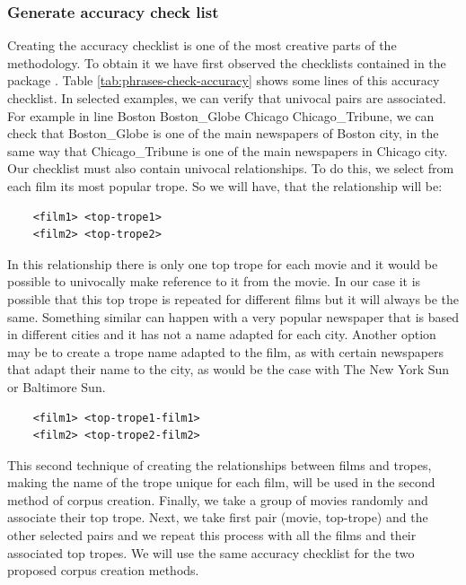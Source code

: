 \documentclass[letterpaper]{article}
\begin{document}
	
	\subsubsection{Generate accuracy check list}
	Creating the accuracy checklist is one of the most creative parts of the methodology. To obtain it we have first observed the checklists contained in the package \cite{git-hub-word2vec}. Table \ref{tab:phrases-check-accuracy} shows some lines of this accuracy checklist. 
	In selected examples, we can verify that univocal pairs are associated. For example in line	Boston Boston\_Globe Chicago Chicago\_Tribune, we can check that 
	Boston\_Globe is one of the main newspapers of Boston city, in the same way that Chicago\_Tribune is one of the main newspapers in Chicago city. Our checklist must also contain univocal relationships. To do this, we select from each film its most popular trope. So we will have, that the relationship will be:
	
	\begin{verbatim}
	<film1> <top-trope1> 
	<film2> <top-trope2>
	\end{verbatim}
	
	In this relationship there is only one top trope for each movie and it would be possible to univocally make reference to it from the movie. In our case it is possible that this top trope is repeated for different films but it will always be the same. Something similar can happen with a very popular newspaper that is based in different cities and it has not a name adapted for each city. Another option may be to create a trope name adapted to the film, as with certain newspapers that adapt their name to the city, as would be the case with The New York Sun or Baltimore Sun. 
	\begin{verbatim}
	<film1> <top-trope1-film1> 
	<film2> <top-trope2-film2>
	\end{verbatim}
	
	This second technique of creating the relationships between films and tropes, making the name of the trope unique for each film, will be used in the second method of corpus creation. Finally, we take a group of movies randomly and associate their top trope. Next, we take first pair (movie, top-trope) and the other selected pairs and we repeat this process with all the films and their associated top tropes. We will use the same accuracy checklist for the two proposed corpus creation methods.   
\end{document}
